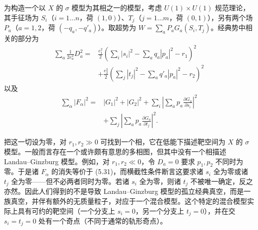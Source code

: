 为构造一个以 $X$ 的 $\sigma$ 模型为其相之一的模型，考虑 $U(1)\times U(1)$ 规范理论，其手征场为 $S_i$（$i=1\ldots n$，荷 $(1,0)$）、$T_j$（$j=1\ldots m$，荷 $(0,1)$），另有两个场 $P_a$（$a=1,2$，荷 $(-q_a,-q'_a)$）。取超势为 $W=\sum_a P_aG_a(S_i,T_j)$。经典势中相关的部分为
\begin{equation}\tag{5.32}
\begin{aligned}
\sum_a\frac{1}{2e_a^2}D_a^2={}&\frac{e_1^2}{2}\left(\sum_i|s_i|^2-\sum_a q_a|p_a|^2-r_1\right)^2\\
&+\frac{e_2^2}{2}\left(\sum_j|t_j|^2-\sum_a q'_a|p_a|^2-r_2\right)^2
\end{aligned}
\end{equation}
以及
\begin{equation}\tag{5.33}
\begin{aligned}
\sum_\alpha|F_\alpha|^2={}&|G_1|^2+|G_2|^2+\sum_i\left|\sum_a p_a\frac{\partial G_a}{\partial s_i}\right|^2\\
&+\sum_j\left|\sum_a p_a\frac{\partial G_a}{\partial t_j}\right|^2.
\end{aligned}
\end{equation}


把这一切设为零，对 $r_1,r_2\gg0$ 可找到一个相，它在低能下描述靶空间为 $X$ 的 $\sigma$ 模型。一般而言存在一个或许颇有意思的多相图，但其中没有一个相描述 Landau--Ginzburg 模型。例如，对 $r_1,r_2\ll0$，令 $D_a=0$ 要求 $p_1,p_2$ 不同时为零。于是诸 $F_\alpha$ 的消失等价于 (5.31)，而横截性条件断言这要求诸 $s_i$ 全为零或诸 $t_j$ 全为零——但不必两者同时为零。若诸 $s_i$ 全为零，则诸 $t_j$ 不被唯一确定，反之亦然。因此人们得到的不是导致 Landau--Ginzburg 模型的孤立经典真空，而是一族真空，并伴有额外的无质量粒子，对应于一个混合模型。这个特定的混合模型实际上具有可约的靶空间（一个分支上 $s_i=0$，另一个分支上 $t_j=0$），并在交 $s_i=t_j=0$ 处有一个奇点（不同于通常的轨形奇点）。

